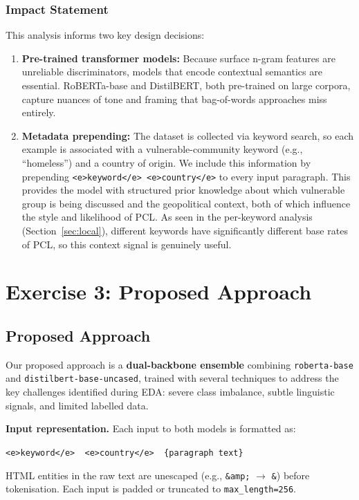 \documentclass[11pt]{article}
\begin{document}
\subsubsection*{Impact Statement}

This analysis informs two key design decisions:

\begin{enumerate}[noitemsep]
    \item \textbf{Pre-trained transformer models:} Because surface n-gram features are unreliable discriminators, models that encode contextual semantics are essential. RoBERTa-base and DistilBERT, both pre-trained on large corpora, capture nuances of tone and framing that bag-of-words approaches miss entirely.

    \item \textbf{Metadata prepending:} The dataset is collected via keyword search, so each example is associated with a vulnerable-community keyword (e.g., ``homeless'') and a country of origin. We include this information by prepending \texttt{<e>keyword</e> <e>country</e>} to every input paragraph. This provides the model with structured prior knowledge about which vulnerable group is being discussed and the geopolitical context, both of which influence the style and likelihood of PCL. As seen in the per-keyword analysis (Section~\ref{sec:local}), different keywords have significantly different base rates of PCL, so this context signal is genuinely useful.
\end{enumerate}

\clearpage
\section{Exercise 3: Proposed Approach}
\label{sec:approach}

\subsection{Proposed Approach}

Our proposed approach is a \textbf{dual-backbone ensemble} combining \texttt{roberta-base} and \texttt{distilbert-base-uncased}, trained with several techniques to address the key challenges identified during EDA: severe class imbalance, subtle linguistic signals, and limited labelled data.

\textbf{Input representation.} Each input to both models is formatted as:
\begin{center}
    \texttt{<e>keyword</e>\ \ <e>country</e>\ \ \{paragraph text\}}
\end{center}
HTML entities in the raw text are unescaped (e.g., \texttt{\&amp;} $\to$ \texttt{\&}) before tokenisation. Each input is padded or truncated to \texttt{max\_length=256}.
\end{document}
